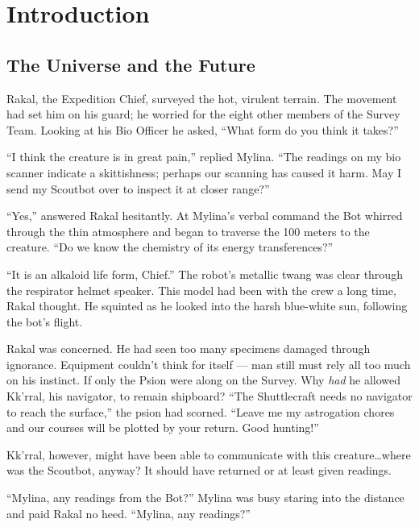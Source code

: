 

\chapter{Introduction}
\label{sec:introduction}


\section{The Universe and the Future}
\label{sec:universe-future}

Rakal, the Expedition Chief, surveyed the hot, virulent terrain.  The
movement had set him on his guard; he worried for the eight other
members of the Survey Team.  Looking at his Bio Officer he asked,
``What form do you think it takes?''

``I think the creature is in great pain,'' replied Mylina.  ``The
readings on my bio scanner indicate a skittishness; perhaps our
scanning has caused it harm.  May I send my Scoutbot over to inspect
it at closer range?''

``Yes,'' answered Rakal hesitantly.  At Mylina's verbal command the
Bot whirred through the thin atmosphere and began to traverse the 100
meters to the creature.  ``Do we know the chemistry of its energy
transferences?''

``It is an alkaloid life form, Chief.'' The robot's metallic twang was
clear through the respirator helmet speaker.  This model had been with
the crew a long time, Rakal thought.  He squinted as he looked into
the harsh blue-white sun, following the bot's flight.

Rakal was concerned.  He had seen too many specimens damaged through
ignorance.  Equipment couldn't think for itself --- man still must
rely all too much on his instinct.  If only the Psion were along on
the Survey.  Why \emph{had} he allowed Kk'rral, his navigator, to
remain shipboard? ``The Shuttlecraft needs no navigator to reach the
surface,'' the psion had scorned.  ``Leave me my astrogation chores
and our courses will be plotted by your return.  Good hunting!''

Kk'rral, however, might have been able to communicate with this
creature\ldots where was the Scoutbot, anyway? It should have returned
or at least given readings.

``Mylina, any readings from the Bot?'' Mylina was busy staring into
the distance and paid Rakal no heed.  ``Mylina, any readings?''

